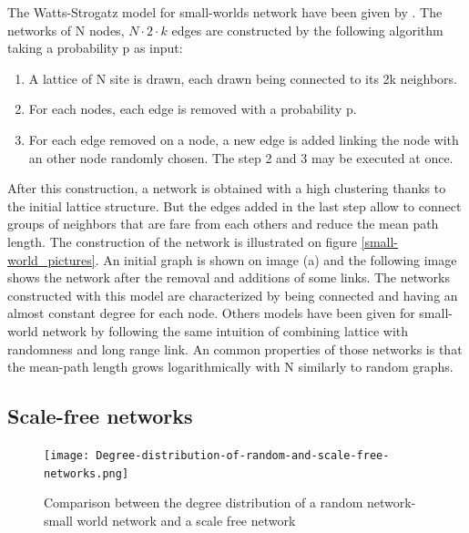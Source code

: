 \documentclass[a4paper, 12pt]{report}
\begin{document}
The Watts-Strogatz model for small-worlds network have been given by \cite{globalClustering1}. The networks of N nodes, $N \cdot 2 \cdot k$ edges are constructed by the following algorithm taking a probability p as input:
\begin{enumerate}
\item A lattice of N site is drawn, each drawn being connected to its 2k neighbors.
\item For each nodes, each edge is removed with a probability p. 
\item For each edge removed on a node, a new edge is added linking the node with an other node randomly chosen. The step 2 and 3 may be executed at once.
\end{enumerate}
After this construction, a network is obtained with a high clustering thanks to the initial lattice structure. But the edges added in the last step allow to connect groups of neighbors that are fare from each others and reduce the mean path length. The construction of the network is illustrated on figure \ref{small-world_pictures}. An initial graph is shown on image (a) and the following image shows the network after the removal and additions of some links. The networks constructed with this model are characterized by being connected and having an almost constant degree for each node. Others models have been given for small-world network by following the same intuition of combining lattice with randomness and long range link. An common properties of those networks is that the mean-path length grows logarithmically with N  similarly to random graphs.\citep{small-world, complex_networks}

\subsection{Scale-free networks}
\label{scale-free-section}
\begin{figure}
\centering
\texttt{[image: Degree-distribution-of-random-and-scale-free-networks.png]}
\caption{Comparison between the degree distribution of a random network- small world network and a scale free network \citep{scale-free_degree}}
\label{scale-free_degree}
\end{figure}
\end{document}
